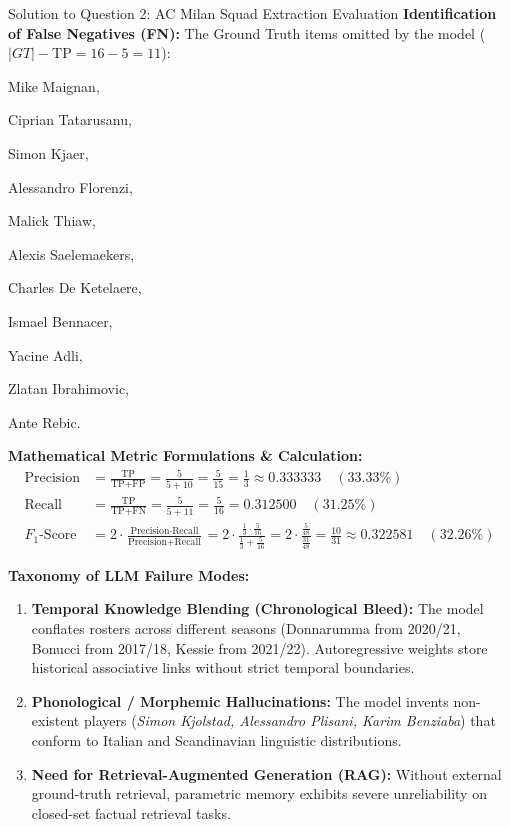 \documentclass[11pt,a4paper]{article}
\begin{document}
\begin{solutionbox}{Solution to Question 2: AC Milan Squad Extraction Evaluation}
\noindent
\textbf{Identification of False Negatives (FN):}
The Ground Truth items omitted by the model ($|GT| - \text{TP} = 16 - 5 = 11$):
\begin{enumerate*}[label=(\arabic*)]
    \item Mike Maignan,
    \item Ciprian Tatarusanu,
    \item Simon Kjaer,
    \item Alessandro Florenzi,
    \item Malick Thiaw,
    \item Alexis Saelemaekers,
    \item Charles De Ketelaere,
    \item Ismael Bennacer,
    \item Yacine Adli,
    \item Zlatan Ibrahimovic,
    \item Ante Rebic.
\end{enumerate*}

\medskip
\noindent
\textbf{Mathematical Metric Formulations \& Calculation:}
\begin{align*}
    \text{Precision} &= \frac{\text{TP}}{\text{TP} + \text{FP}} = \frac{5}{5 + 10} = \frac{5}{15} = \frac{1}{3} \approx \mathbf{0.333333 \quad (33.33\%)} \\[6pt]
    \text{Recall} &= \frac{\text{TP}}{\text{TP} + \text{FN}} = \frac{5}{5 + 11} = \frac{5}{16} = \mathbf{0.312500 \quad (31.25\%)} \\[6pt]
    F_1\text{-Score} &= 2 \cdot \frac{\text{Precision} \cdot \text{Recall}}{\text{Precision} + \text{Recall}} = 2 \cdot \frac{\frac{1}{3} \cdot \frac{5}{16}}{\frac{1}{3} + \frac{5}{16}} = 2 \cdot \frac{\frac{5}{48}}{\frac{31}{48}} = \frac{10}{31} \approx \mathbf{0.322581 \quad (32.26\%)}
\end{align*}

\medskip
\noindent
\textbf{Taxonomy of LLM Failure Modes:}
\begin{enumerate}[leftmargin=1.5em]
    \item \textbf{Temporal Knowledge Blending (Chronological Bleed):} The model conflates rosters across different seasons (Donnarumma from 2020/21, Bonucci from 2017/18, Kessie from 2021/22). Autoregressive weights store historical associative links without strict temporal boundaries.
    \item \textbf{Phonological / Morphemic Hallucinations:} The model invents non-existent players (\textit{Simon Kjolstad, Alessandro Plisani, Karim Benziaba}) that conform to Italian and Scandinavian linguistic distributions.
    \item \textbf{Need for Retrieval-Augmented Generation (RAG):} Without external ground-truth retrieval, parametric memory exhibits severe unreliability on closed-set factual retrieval tasks.
\end{enumerate}
\end{solutionbox}
\end{document}
